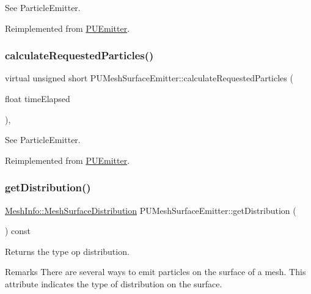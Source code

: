 See Particle\+Emitter. 

Reimplemented from \hyperlink{classPUEmitter}{P\+U\+Emitter}.

\mbox{\label{classPUMeshSurfaceEmitter_a11bb2e8f1f8611bfbacec1e9cd3789e9}} 
\subsubsection{\texorpdfstring{calculate\+Requested\+Particles()}{calculateRequestedParticles()}\hspace{0.1cm}{\footnotesize\ttfamily [2/2]}}
{\footnotesize\ttfamily virtual unsigned short P\+U\+Mesh\+Surface\+Emitter\+::calculate\+Requested\+Particles (\begin{DoxyParamCaption}\item[{float}]{time\+Elapsed }\end{DoxyParamCaption})\hspace{0.3cm}{\ttfamily [override]}, {\ttfamily [virtual]}}

See Particle\+Emitter. 

Reimplemented from \hyperlink{classPUEmitter}{P\+U\+Emitter}.

\mbox{\label{classPUMeshSurfaceEmitter_a214f28fc4cf1534a7e586c94c5fc3c6c}} 
\subsubsection{\texorpdfstring{get\+Distribution()}{getDistribution()}\hspace{0.1cm}{\footnotesize\ttfamily [1/2]}}
{\footnotesize\ttfamily \hyperlink{classMeshInfo_aadc99105abbc3bd033e33c6ba512a13b}{Mesh\+Info\+::\+Mesh\+Surface\+Distribution} P\+U\+Mesh\+Surface\+Emitter\+::get\+Distribution (\begin{DoxyParamCaption}{ }\end{DoxyParamCaption}) const}

Returns the type op distribution. \begin{DoxyRemark}{Remarks}
There are several ways to emit particles on the surface of a mesh. This attribute indicates the type of distribution on the surface. 
\end{DoxyRemark}
\mbox{\label{classPUMeshSurfaceEmitter_a214f28fc4cf1534a7e586c94c5fc3c6c}} 
